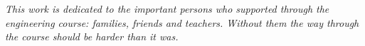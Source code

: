 \begin{dedication}
   \vspace*{\fill}
   \centering
   \noindent
   \textit{ This work is dedicated to the important persons who supported through the
   engineering course: families, friends and teachers. Without them the way through the
   course should be harder than it was.  } \vspace*{\fill}
\end{dedication}
